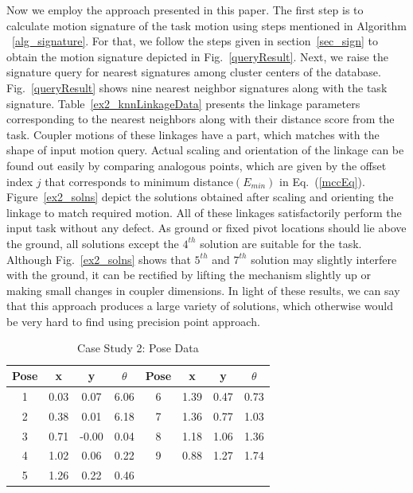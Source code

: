 \documentclass[twocolumn,10pt]{asme2ej}
\newcommand{\req}[1]{(\ref{#1})}
\begin{document}
Now we employ the approach presented in this paper.
The first step is to calculate motion signature of the task motion using steps mentioned in Algorithm ~\ref{alg_signature}.
For that, we follow the steps given in section~\ref{sec_sign} to obtain the motion signature depicted in Fig.~\ref{queryResult}.
Next, we raise the signature query for nearest signatures among cluster centers of the database.
Fig.~\ref{queryResult} shows nine nearest neighbor signatures along with the task signature.
Table~\ref{ex2_knnLinkageData} presents the linkage parameters corresponding to the nearest neighbors along with their distance score from the task.
Coupler motions of these linkages have a part, which matches with the shape of input motion query.
Actual scaling and orientation of the linkage can be found out easily by comparing analogous points, which are given by the offset index $j$ that corresponds to minimum distance$(E_{min})$ in Eq.~\req{mccEq}.
Figure~\ref{ex2_solns} depict the solutions obtained after scaling and orienting the linkage to match required motion.
All of these linkages satisfactorily perform the input task without any defect.
As ground or fixed pivot locations should lie above the ground, all solutions except the $4^{th}$ solution are suitable for the task.
Although Fig.~\ref{ex2_solns} shows that $5^{th}$ and $7^{th}$ solution may slightly interfere with the ground, it can be rectified by lifting the mechanism slightly up or making small changes in coupler dimensions.
In light of these results, we can say that this approach produces a large variety of solutions, which otherwise would be very hard to find using precision point approach.


\begin{table}
\caption{Case Study 2: Pose Data}
\centering
\label{poseData}
\begin{tabular}{cccccccc}
\hline
Pose & x & y & $\theta$ & Pose & x & y & $\theta$ \\
\hline
1 & 0.03 & 0.07 & 6.06 & 6 & 1.39 & 0.47 & 0.73 \\
2 & 0.38 & 0.01 & 6.18 & 7 & 1.36 & 0.77 & 1.03 \\
3 & 0.71 &-0.00 & 0.04 & 8 & 1.18 & 1.06 & 1.36 \\
4 & 1.02 & 0.06 & 0.22 & 9 & 0.88 & 1.27 & 1.74 \\
5 & 1.26 & 0.22 & 0.46 & \\
\end{tabular}
\end{table}
\end{document}
